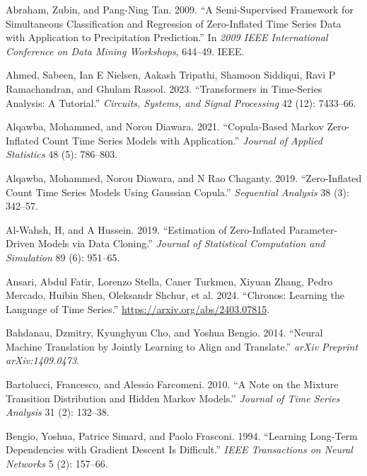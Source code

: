 \documentclass[
  letterpaper,
  double,
  12pt,
  1.0in]{beavtex}
\newlength{\cslhangindent}
\newenvironment{CSLReferences}[2] %
 {\begin{list}{}{%
  \setlength{\itemindent}{0pt}
  \setlength{\leftmargin}{0pt}
  \setlength{\parsep}{0pt}
  \ifodd #1
   \setlength{\leftmargin}{\cslhangindent}
   \setlength{\itemindent}{-1\cslhangindent}
  \fi
  \setlength{\itemsep}{#2\baselineskip}}}
 {\end{list}}
\begin{document}
\label{refs}
\begin{CSLReferences}{1}{0}
Abraham, Zubin, and Pang-Ning Tan. 2009. {``A Semi-Supervised Framework
for Simultaneous Classification and Regression of Zero-Inflated Time
Series Data with Application to Precipitation Prediction.''} In
\emph{2009 IEEE International Conference on Data Mining Workshops},
644--49. IEEE.

Ahmed, Sabeen, Ian E Nielsen, Aakash Tripathi, Shamoon Siddiqui, Ravi P
Ramachandran, and Ghulam Rasool. 2023. {``Transformers in Time-Series
Analysis: A Tutorial.''} \emph{Circuits, Systems, and Signal Processing}
42 (12): 7433--66.

Alqawba, Mohammed, and Norou Diawara. 2021. {``Copula-Based Markov
Zero-Inflated Count Time Series Models with Application.''}
\emph{Journal of Applied Statistics} 48 (5): 786--803.

Alqawba, Mohammed, Norou Diawara, and N Rao Chaganty. 2019.
{``Zero-Inflated Count Time Series Models Using Gaussian Copula.''}
\emph{Sequential Analysis} 38 (3): 342--57.

Al-Wahsh, H, and A Hussein. 2019. {``Estimation of Zero-Inflated
Parameter-Driven Models via Data Cloning.''} \emph{Journal of
Statistical Computation and Simulation} 89 (6): 951--65.

Ansari, Abdul Fatir, Lorenzo Stella, Caner Turkmen, Xiyuan Zhang, Pedro
Mercado, Huibin Shen, Oleksandr Shchur, et al. 2024. {``Chronos:
Learning the Language of Time Series.''}
\url{https://arxiv.org/abs/2403.07815}.

Bahdanau, Dzmitry, Kyunghyun Cho, and Yoshua Bengio. 2014. {``Neural
Machine Translation by Jointly Learning to Align and Translate.''}
\emph{arXiv Preprint arXiv:1409.0473}.

Bartolucci, Francesco, and Alessio Farcomeni. 2010. {``A Note on the
Mixture Transition Distribution and Hidden Markov Models.''}
\emph{Journal of Time Series Analysis} 31 (2): 132--38.

Bengio, Yoshua, Patrice Simard, and Paolo Frasconi. 1994. {``Learning
Long-Term Dependencies with Gradient Descent Is Difficult.''} \emph{IEEE
Transactions on Neural Networks} 5 (2): 157--66.


\end{CSLReferences}
\end{document}
